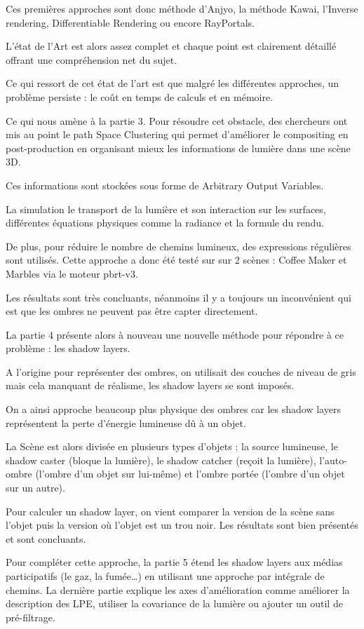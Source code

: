 \documentclass{article}
\begin{document}
Ces premières approches sont donc méthode d’Anjyo, la méthode Kawai, l’Inverse rendering, Differentiable Rendering ou encore RayPortals.

L’état de l’Art est alors assez complet et chaque point est clairement détaillé offrant une compréhension net du sujet.

Ce qui ressort de cet état de l’art est que malgré les différentes approches, un problème persiste : le coût en temps de calculs et en mémoire.

Ce qui nous amène à la partie 3. Pour résoudre cet obstacle, des chercheurs ont mis au point le path Space Clustering qui permet d’améliorer le compositing en post-production en organisant mieux les informations de lumière dans une scène 3D.

Ces informations sont stockées sous forme de Arbitrary Output Variables.

La simulation le transport de la lumière et son interaction sur les surfaces, différentes équations physiques comme la radiance et la formule du rendu.

De plus, pour réduire le nombre de chemins lumineux, des expressions régulières sont utilisés. Cette approche a donc été testé sur sur 2 scènes : Coffee Maker et Marbles via le moteur pbrt-v3.

Les résultats sont très concluants, néanmoins il y a toujours un inconvénient qui est que les ombres ne peuvent pas être capter directement.

La partie 4 présente alors à nouveau une nouvelle méthode pour répondre à ce problème : les shadow layers.

A l’origine pour représenter des ombres, on utilisait des couches de niveau de gris mais cela manquant de réalisme, les shadow layers se sont imposés.

On a ainsi approche beaucoup plus physique des ombres car les shadow layers représentent la perte d’énergie lumineuse dû à un objet.

La Scène est alors divisée en plusieurs types d’objets : la source lumineuse, le shadow caster (bloque la lumière), le shadow catcher (reçoit la lumière), l’auto-ombre (l’ombre d’un objet sur lui-même) et l’ombre portée (l’ombre d’un objet sur un autre).

Pour calculer un shadow layer, on vient comparer la version de la scène sans l’objet puis la version où l’objet est un trou noir. Les résultats sont bien présentés et sont concluants.

Pour compléter cette approche, la partie 5 étend les shadow layers aux médias participatifs (le gaz, la fumée…) en utilisant une approche par intégrale de chemins. La dernière partie explique les axes d’amélioration comme améliorer la description des LPE, utiliser la covariance de la lumière ou ajouter un outil de pré-filtrage.
\end{document}
